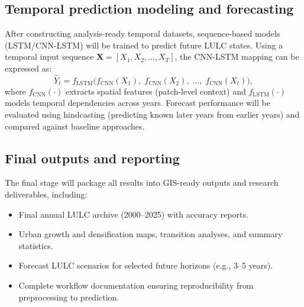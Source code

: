 \subsection{Temporal prediction modeling and forecasting}
After constructing analysis-ready temporal datasets, sequence-based models (LSTM/CNN-LSTM) will be trained to predict future LULC states. Using a temporal input sequence $\mathbf{X} = [X_1, X_2, \dots, X_T]$, the CNN-LSTM mapping can be expressed as:
\begin{equation}
\hat{Y}_t = f_{\text{LSTM}}\!\bigl(f_{\text{CNN}}(X_1),\; f_{\text{CNN}}(X_2),\; \dots,\; f_{\text{CNN}}(X_t)\bigr),
\end{equation}
where $f_{\text{CNN}}(\cdot)$ extracts spatial features (patch-level context) and $f_{\text{LSTM}}(\cdot)$ models temporal dependencies across years. Forecast performance will be evaluated using hindcasting (predicting known later years from earlier years) and compared against baseline approaches.

\subsection{Final outputs and reporting}
The final stage will package all results into GIS-ready outputs and research deliverables, including:
\begin{itemize}
  \item Final annual LULC archive (2000--2025) with accuracy reports.
  \item Urban growth and densification maps, transition analyses, and summary statistics.
  \item Forecast LULC scenarios for selected future horizons (e.g., 3--5 years).
  \item Complete workflow documentation ensuring reproducibility from preprocessing to prediction.
\end{itemize}

